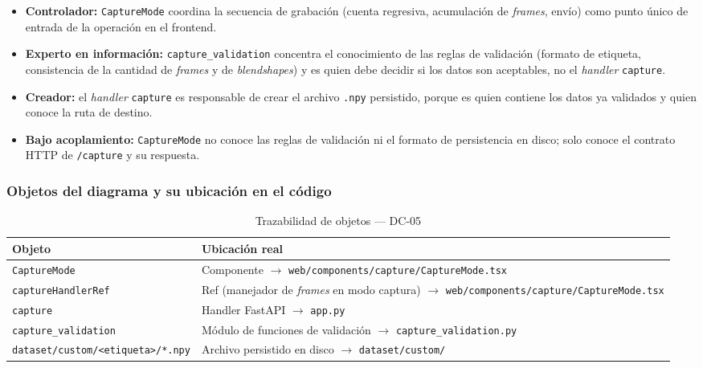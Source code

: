 \begin{itemize}[leftmargin=*, itemsep=2pt]
    \item \textbf{Controlador:} \texttt{CaptureMode} coordina la secuencia de
    grabación (cuenta regresiva, acumulación de \textit{frames}, envío) como
    punto único de entrada de la operación en el frontend.
    \item \textbf{Experto en información:} \texttt{capture\_validation}
    concentra el conocimiento de las reglas de validación (formato de
    etiqueta, consistencia de la cantidad de \textit{frames} y de
    \textit{blendshapes}) y es quien debe decidir si los datos son
    aceptables, no el \textit{handler} \texttt{capture}.
    \item \textbf{Creador:} el \textit{handler} \texttt{capture} es
    responsable de crear el archivo \texttt{.npy} persistido, porque es
    quien contiene los datos ya validados y quien conoce la ruta de
    destino.
    \item \textbf{Bajo acoplamiento:} \texttt{CaptureMode} no conoce las
    reglas de validación ni el formato de persistencia en disco; solo conoce
    el contrato HTTP de \texttt{/capture} y su respuesta.
\end{itemize}

\subsubsection{Objetos del diagrama y su ubicación en el código}

\begin{table}[H]
\centering
\begin{tabularx}{\textwidth}{@{}l X@{}}
\toprule
\textbf{Objeto} & \textbf{Ubicación real} \\
\midrule
\texttt{CaptureMode} & Componente $\rightarrow$ \texttt{web/components/capture/CaptureMode.tsx} \\
\texttt{captureHandlerRef} & Ref (manejador de \textit{frames} en modo captura) $\rightarrow$ \texttt{web/components/capture/CaptureMode.tsx} \\
\texttt{capture} & Handler FastAPI $\rightarrow$ \texttt{app.py} \\
\texttt{capture\_validation} & Módulo de funciones de validación $\rightarrow$ \texttt{capture\_validation.py} \\
\texttt{dataset/custom/<etiqueta>/*.npy} & Archivo persistido en disco $\rightarrow$ \texttt{dataset/custom/} \\
\bottomrule
\end{tabularx}
\caption{Trazabilidad de objetos --- DC-05}
\label{tab:col-objetos-dc05}
\end{table}

